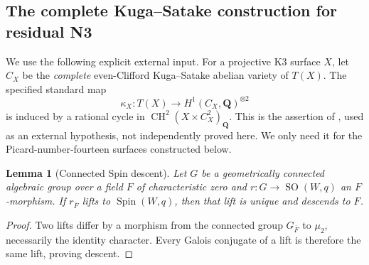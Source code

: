 \documentclass[10pt,reqno]{article}
\theoremstyle{emphasizedplain}
\newtheorem{lemma}[theorem]{Lemma}
\theoremstyle{emphasizeddefinition}
\theoremstyle{emphasizeddefinition}
\DeclareMathOperator{\SO}{SO}
\DeclareMathOperator{\CH}{CH}
\newcommand{\Q}{\mathbf Q}
\begin{document}
\subsection*{The complete Kuga--Satake construction for residual N3}
We use the following explicit external input. For a projective K3 surface
$X$, let $C_X$ be the \emph{complete} even-Clifford Kuga--Satake abelian
variety of $T(X)$. The specified standard map
\[
 \kappa_X:T(X)\longrightarrow H^1(C_X,\Q)^{\otimes2}
\]
is induced by a rational cycle in $\CH^2(X\times C_X^2)_\Q$.
This is the assertion of \cite[Theorem 1.1]{OpenAIKS}, used as an
external hypothesis, not independently proved here. We only need it for
the Picard-number-fourteen surfaces constructed below.

\begin{lemma}[Connected Spin descent]\label{p:N3spin-descent}
Let $G$ be a geometrically connected algebraic group over a field $F$
of characteristic zero and $r:G\to\SO(W,q)$ an $F$-morphism. If
$r_{\overline F}$ lifts to $\operatorname{Spin}(W,q)$, then that lift is
unique and descends to $F$.
\end{lemma}
\begin{proof}
Two lifts differ by a morphism from the connected group $G_{\overline F}$
to $\mu_2$, necessarily the identity character. Every Galois conjugate
of a lift is therefore the same lift, proving descent.
\end{proof}
\end{document}
